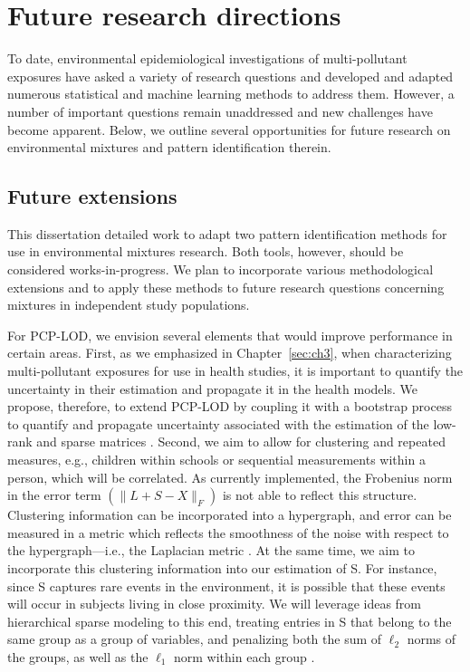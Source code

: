 \section{Future research directions}\label{sec:future}
To date, environmental epidemiological investigations of multi-pollutant exposures have asked a variety of research questions and developed and adapted numerous statistical and machine learning methods to address them. However, a number of important questions remain unaddressed and new challenges have become apparent. Below, we outline several opportunities for future research on environmental mixtures and pattern identification therein.

\subsection{Future extensions}\label{diss:future}
This dissertation detailed work to adapt two pattern identification methods for use in environmental mixtures research. Both tools, however, should be considered works-in-progress. We plan to incorporate various methodological extensions and to apply these methods to future research questions concerning mixtures in independent study populations.

For PCP-LOD, we envision several elements that would improve performance in certain areas. First, as we emphasized in Chapter~\ref{sec:ch3}, when characterizing multi-pollutant exposures for use in health studies, it is important to quantify the uncertainty in their estimation and propagate it in the health models. We propose, therefore, to extend PCP-LOD by coupling it with a bootstrap process to quantify and propagate uncertainty associated with the estimation of the low-rank and sparse matrices \cite{mak14_unc}. Second, we aim to allow for clustering and repeated measures, e.g., children within schools or sequential measurements within a person, which will be correlated. As currently implemented, the Frobenius norm in the error term $\left( \|L+S-X\|_{F} \right)$ is not able to reflect this structure. Clustering information can be incorporated into a hypergraph, and error can be measured in a metric which reflects the smoothness of the noise with respect to the hypergraph---i.e., the Laplacian metric \cite{zhou2006learning, kaminski2019clustering}. At the same time, we aim to incorporate this clustering information into our estimation of S. For instance, since S captures rare events in the environment, it is possible that these events will occur in subjects living in close proximity. We will leverage ideas from hierarchical sparse modeling to this end, treating entries in S that belong to the same group as a group of variables, and penalizing both the sum of $\ell_2$ norms of the groups, as well as the $\ell_1$ norm within each group \cite{yan2017hierarchical, sprechmann2011c, jenatton2011proximal}.

